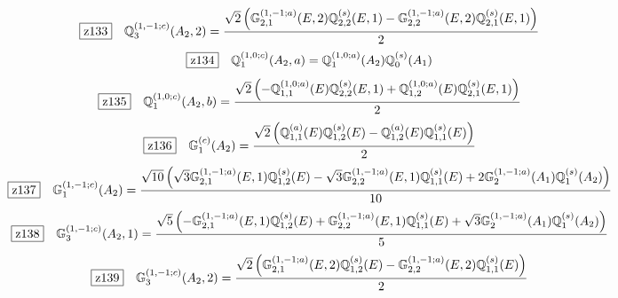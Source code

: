 \documentclass[fleqn,10pt,landscape]{jsarticle}
\begin{document}
\begin{dmath*}
\hspace*{3mm}\fbox{z133}\quad \mathbb{Q}_{3}^{(1,-1;c)}(A_{2},2)=\frac{\sqrt{2} \left(\mathbb{G}_{2,1}^{(1,-1;a)}(E,2) \mathbb{Q}_{2,2}^{(s)}(E,1) - \mathbb{G}_{2,2}^{(1,-1;a)}(E,2) \mathbb{Q}_{2,1}^{(s)}(E,1)\right)}{2}
\end{dmath*}
\begin{dmath*}
\hspace*{3mm}\fbox{z134}\quad \mathbb{Q}_{1}^{(1,0;c)}(A_{2},a)=\mathbb{Q}_{1}^{(1,0;a)}(A_{2}) \mathbb{Q}_{0}^{(s)}(A_{1})
\end{dmath*}
\begin{dmath*}
\hspace*{3mm}\fbox{z135}\quad \mathbb{Q}_{1}^{(1,0;c)}(A_{2},b)=\frac{\sqrt{2} \left(- \mathbb{Q}_{1,1}^{(1,0;a)}(E) \mathbb{Q}_{2,2}^{(s)}(E,1) + \mathbb{Q}_{1,2}^{(1,0;a)}(E) \mathbb{Q}_{2,1}^{(s)}(E,1)\right)}{2}
\end{dmath*}
\begin{dmath*}
\hspace*{3mm}\fbox{z136}\quad \mathbb{G}_{1}^{(c)}(A_{2})=\frac{\sqrt{2} \left(\mathbb{Q}_{1,1}^{(a)}(E) \mathbb{Q}_{1,2}^{(s)}(E) - \mathbb{Q}_{1,2}^{(a)}(E) \mathbb{Q}_{1,1}^{(s)}(E)\right)}{2}
\end{dmath*}
\begin{dmath*}
\hspace*{3mm}\fbox{z137}\quad \mathbb{G}_{1}^{(1,-1;c)}(A_{2})=\frac{\sqrt{10} \left(\sqrt{3} \mathbb{G}_{2,1}^{(1,-1;a)}(E,1) \mathbb{Q}_{1,2}^{(s)}(E) - \sqrt{3} \mathbb{G}_{2,2}^{(1,-1;a)}(E,1) \mathbb{Q}_{1,1}^{(s)}(E) + 2 \mathbb{G}_{2}^{(1,-1;a)}(A_{1}) \mathbb{Q}_{1}^{(s)}(A_{2})\right)}{10}
\end{dmath*}
\begin{dmath*}
\hspace*{3mm}\fbox{z138}\quad \mathbb{G}_{3}^{(1,-1;c)}(A_{2},1)=\frac{\sqrt{5} \left(- \mathbb{G}_{2,1}^{(1,-1;a)}(E,1) \mathbb{Q}_{1,2}^{(s)}(E) + \mathbb{G}_{2,2}^{(1,-1;a)}(E,1) \mathbb{Q}_{1,1}^{(s)}(E) + \sqrt{3} \mathbb{G}_{2}^{(1,-1;a)}(A_{1}) \mathbb{Q}_{1}^{(s)}(A_{2})\right)}{5}
\end{dmath*}
\begin{dmath*}
\hspace*{3mm}\fbox{z139}\quad \mathbb{G}_{3}^{(1,-1;c)}(A_{2},2)=\frac{\sqrt{2} \left(\mathbb{G}_{2,1}^{(1,-1;a)}(E,2) \mathbb{Q}_{1,2}^{(s)}(E) - \mathbb{G}_{2,2}^{(1,-1;a)}(E,2) \mathbb{Q}_{1,1}^{(s)}(E)\right)}{2}
\end{dmath*}
\end{document}
